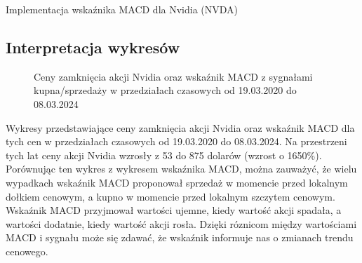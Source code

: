 \documentclass{article}
\begin{document}
\begin{section}{Implementacja wskaźnika MACD dla Nvidia (NVDA)}
    \subsection{Interpretacja wykresów}
    \begin{figure}[H]
        \caption{Ceny zamknięcia akcji Nvidia oraz wskaźnik MACD z sygnałami kupna/sprzedaży w przedziałach czasowych od 19.03.2020 do 08.03.2024}
    \end{figure}
    Wykresy przedstawiające ceny zamknięcia akcji Nvidia oraz wskaźnik MACD dla tych cen w przedziałach czasowych od 19.03.2020 do 08.03.2024.
    Na przestrzeni tych lat ceny akcji Nvidia wzrosły z 53 do 875 dolarów (wzrost o 1650\%).
    Porównując ten wykres z wykresem wskaźnika MACD, można zauważyć, że wielu wypadkach wskaźnik MACD proponował sprzedaż w momencie przed lokalnym dołkiem cenowym, a kupno w momencie przed lokalnym szczytem cenowym.
    Wskaźnik MACD przyjmował wartości ujemne, kiedy wartość akcji spadała, a wartości dodatnie, kiedy wartość akcji rosła.
    Dzięki róznicom między wartościami MACD i sygnału może się zdawać, że wskaźnik informuje nas o zmianach trendu cenowego.


\end{section}
\end{document}
